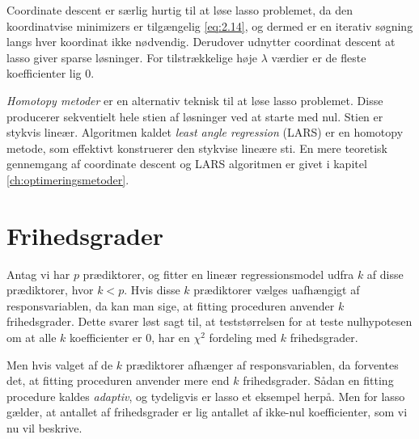 
Coordinate descent er særlig hurtig til at løse lasso problemet, da den koordinatvise minimizers er tilgængelig \eqref{eq:2.14}, og dermed er en iterativ søgning langs hver koordinat ikke nødvendig.
Derudover udnytter coordinat descent at lasso giver sparse løsninger.
For tilstrækkelige høje \(\lambda\) værdier er de fleste koefficienter lig $0$.

\textit{Homotopy metoder} er en alternativ teknisk til at løse lasso problemet. 
Disse producerer sekventielt hele stien af løsninger ved at starte med nul.
Stien er stykvis lineær.
Algoritmen kaldet \textit{least angle regression} (LARS) er en homotopy metode, som effektivt konstruerer den stykvise lineære sti.
En mere teoretisk gennemgang af coordinate descent og LARS algoritmen er givet i kapitel \ref{ch:optimeringsmetoder}.
%
\section{Frihedsgrader}
Antag vi har \(p\) prædiktorer, og fitter en lineær regressionsmodel udfra \(k\) af disse prædiktorer, hvor \(k <p\).
Hvis disse \(k\) prædiktorer vælges uafhængigt af responsvariablen, da kan man sige, at fitting proceduren anvender \(k\) frihedsgrader.
Dette svarer løst sagt til, at teststørrelsen for at teste nulhypotesen om at alle \(k\) koefficienter er 0, har en \(\chi^2\) fordeling med \(k\) frihedsgrader.

Men hvis valget af de \(k\) prædiktorer afhænger af responsvariablen, da forventes det, at fitting proceduren anvender mere end \(k\) frihedsgrader. 
Sådan en fitting procedure kaldes \textit{adaptiv}, og tydeligvis er lasso et eksempel herpå.
Men for lasso gælder, at antallet af frihedsgrader er lig antallet af ikke-nul koefficienter, som vi nu vil beskrive.

